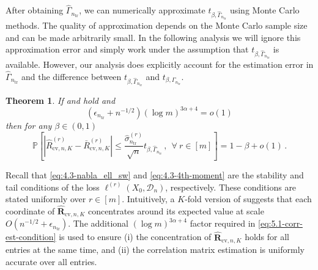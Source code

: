 \documentclass[11pt]{article}
\theoremstyle{plain}
\newtheorem{theorem}{Theorem}[section]
\newcommand{\cv}{{\mathrm{cv}}}
\newcommand{\tr}{{\mathrm{tr}}}
\newcommand{\D}{{\mathcal{D}}}
\begin{document}
After obtaining $\hat\Gamma_{n_\tr}$, we can numerically approximate $t_{\beta,\hat\Gamma_{n_\tr}}$ using Monte Carlo methods.  The quality of approximation depends on the Monte Carlo sample size and can be made arbitrarily small. In the following analysis we will ignore this approximation error and simply work under the assumption that $t_{\beta,\hat\Gamma_{n_\tr}}$ is available.  However, our analysis does explicitly account for the estimation error in $\hat \Gamma_{n_\tr}$ and the difference between $t_{\beta,\hat\Gamma_{n_\tr}}$ and $t_{\beta,\Gamma_{n_\tr}}$.

\begin{theorem}
    \label{thm:5.1-simul-conf-set-naive}
    If  and  hold and
    \begin{equation}\label{eq:5.1-corr-est-condition}(\epsilon_{n_\tr}+n^{-1/2})(\log m)^{3\alpha+4}=o(1)\end{equation} then for any $\beta\in(0,1)$
    \begin{equation*}
        \mathbb P\left[\left|\hat R_{\cv,n,K}^{(r)}-\bar R_{\cv,n,K}^{(r)}\right|\le \frac{\hat\sigma_{n_\tr}^{(r)}}{\sqrt{n}}t_{\beta,\hat\Gamma_{n_\tr}}\,,~~\forall~r\in[m]\right] = 1-\beta+o(1)\,.
    \end{equation*}
\end{theorem}
Recall that \eqref{eq:4.3-nabla_ell_sw} and \eqref{eq:4.3-4th-moment} are the stability and tail conditions of the loss $\ell^{(r)}(X_0,\D_n)$, respectively. These conditions are stated uniformly over $r\in[m]$.
Intuitively, a $K$-fold version of  suggests that each coordinate of $\hat{\mathbf R}_{\cv,n,K}$ concentrates around its expected value at scale $O(n^{-1/2}+\epsilon_{n_\tr})$. The additional $(\log m)^{3\alpha+4}$ factor required in \eqref{eq:5.1-corr-est-condition} is used to ensure (i) the concentration of $\hat{\mathbf R}_{\cv,n,K}$ holds for all entries at the same time, and (ii) the correlation matrix estimation is uniformly accurate over all entries.
\end{document}
